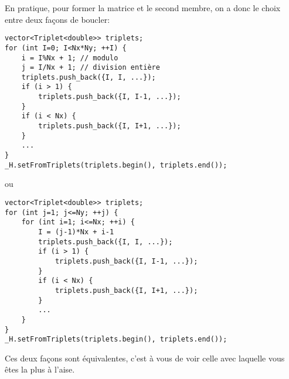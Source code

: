 \documentclass[11pt]{article}
\begin{document}
\pagebreak

En pratique, pour former la matrice et le second membre, on a donc le choix entre deux façons de boucler:

\begin{verbatim}
vector<Triplet<double>> triplets;
for (int I=0; I<Nx*Ny; ++I) {
    i = I%Nx + 1; // modulo
    j = I/Nx + 1; // division entière
    triplets.push_back({I, I, ...});
    if (i > 1) {
        triplets.push_back({I, I-1, ...});
    }
    if (i < Nx) {
        triplets.push_back({I, I+1, ...});
    } 
    ...
}
_H.setFromTriplets(triplets.begin(), triplets.end());
\end{verbatim}

ou

\begin{verbatim}
vector<Triplet<double>> triplets;
for (int j=1; j<=Ny; ++j) {
    for (int i=1; i<=Nx; ++i) {
        I = (j-1)*Nx + i-1
        triplets.push_back({I, I, ...});
        if (i > 1) {
            triplets.push_back({I, I-1, ...});
        }
        if (i < Nx) {
            triplets.push_back({I, I+1, ...});
        } 
        ...
    }
}
_H.setFromTriplets(triplets.begin(), triplets.end());
\end{verbatim}

Ces deux façons sont équivalentes, c'est à vous de voir celle avec laquelle vous êtes la plus à l'aise.
\end{document}
